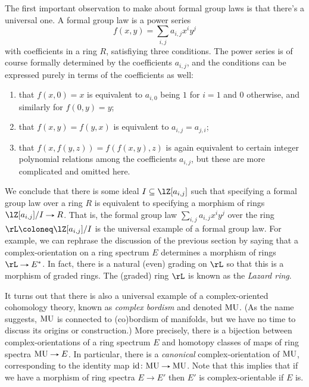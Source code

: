 \begin{nothing}
  \label{chrom-univfgl}
  The first important observation to make about formal group laws is
  that there's a universal one. A formal group law is a power series
  \[
  f(x,y) = \sum_{i,j} a_{i,j} x^i y^j
  \]
  with coefficients in a ring $R$, satisfiying three conditions. The
  power series is of course formally determined by the coefficients
  $a_{i,j}$, and the conditions can be expressed purely in terms of
  the coefficients as well:
  \begin{enumerate}
  \item that $f(x,0) = x$ is equivalent to $a_{i,0}$ being $1$ for
    $i = 1$ and $0$ otherwise, and similarly for $f(0,y) = y$;
  \item that $f(x,y) = f(y,x)$ is equivalent to $a_{i,j} = a_{j,i}$;
  \item that $f(x,f(y,z)) = f(f(x,y),z)$ is again equivalent to
    certain integer polynomial relations among the coefficients
    $a_{i,j}$, but these are more complicated and omitted here.
  \end{enumerate}
  We conclude that there is some ideal $I \subseteq \lZ[a_{i,j}]$ such
  that specifying a formal group law over a ring $R$ is equivalent to
  specifying a morphism of rings $\lZ[a_{i,j}]/I \to R$. That is, the
  formal group law $\sum_{i,j} a_{i,j} x^i y^j$ over the ring
  $\rL \ce \lZ[a_{i,j}]/I$ is the universal example of a formal group
  law. For example, we can rephrase the discussion of the previous
  section by saying that a complex-orientation on a ring spectrum $E$
  determines a morphism of rings $\rL \to E^*$. In fact, there is a
  natural (even) grading on $\rL$ so that this is a morphism of graded
  rings. The (graded) ring $\rL$ is known as the \emph{Lazard ring}.
\end{nothing}

\begin{nothing}
  \label{chrom-mu}
  It turns out that there is also a universal example of a
  complex-oriented cohomology theory, known as \emph{complex bordism}
  and denoted $\mathrm{MU}$. (As the name suggests, $\mathrm{MU}$ is connected to
  (co)bordism of manifolds, but we have no time to discuss its origins
  or construction.) More precisely, there is a bijection between
  complex-orientations of a ring spectrum $E$ and homotopy classes of
  maps of ring spectra $\MU \to E$. In particular, there is a
  \emph{canonical} complex-orientation of $\mathrm{MU}$, corresponding to the
  identity map $\id \c \MU \to \MU$. Note that this implies that if we
  have a morphism of ring spectra $E \to E'$ then $E'$ is
  complex-orientable if $E$ is.
\end{nothing}


